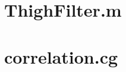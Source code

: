 \section{ThighFilter.m}
\lstset{language=Matlab}


\newpage
\section{correlation.cg}
\lstset{language=Cg}
